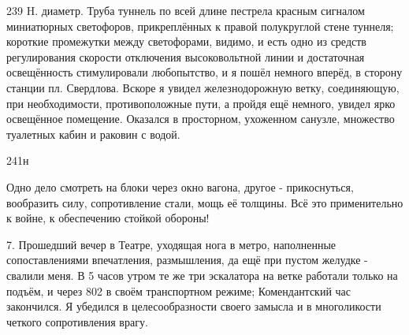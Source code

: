 239 H. диаметр. Труба туннель по всей длине пестрела красным сигналом миниатюрных светофоров, прикреплённых к правой полукруглой стене туннеля; короткие промежутки между светофорами, видимо, и есть одно из средств регулирования скорости отключения высоковольтной линии и достаточная освещённость стимулировали любопытство, и я пошёл немного вперёд, в сторону станции пл. Свердлова. Вскоре я увидел железнодорожную ветку, соединяющую, при необходимости, противоположные пути, а пройдя ещё немного, увидел ярко освещённое помещение. Оказался в просторном, ухоженном санузле, множество туалетных кабин и раковин с водой.

241н

Одно дело смотреть на блоки через окно вагона, другое - прикоснуться, вообразить силу, сопротивление стали, мощь её толщины. Всё это применительно к войне, к обеспечению стойкой обороны!

7. Прошедший вечер в Театре, уходящая нога в метро, наполненные сопоставлениями впечатления, размышления, да ещё при пустом желудке - свалили меня. В 5 часов утром те же три эскалатора на ветке работали только на подъём, и через 802 в своём транспортном режиме; Комендантский час закончился. Я убедился в целесообразности своего замысла и в многоликости четкого сопротивления врагу.
